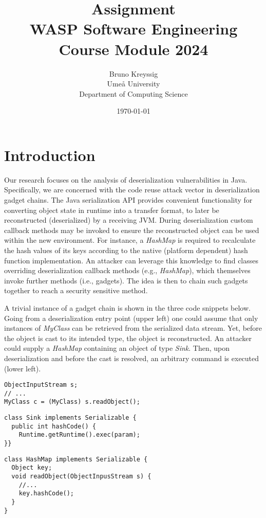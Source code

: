 \documentclass[11pt]{article}
\title{Assignment\\\Large{WASP Software Engineering Course Module 2024}}
\author{Bruno Kreyssig \\ Umeå University\\ Department of Computing Science}
\date{\today}
\begin{document}
\maketitle
\thispagestyle{fancy}
\clearpage
\tableofcontents
\thispagestyle{fancy}

\clearpage
\fancyfoot[C]{\thepage}

\section*{Introduction}

Our research focuses on the analysis of deserialization vulnerabilities in Java. Specifically, we are concerned with the code reuse attack vector in deserialization gadget chains. The Java serialization API provides convenient functionality for converting object state in runtime into a transfer format, to later be reconstructed (deserialized) by a receiving JVM. During deserialization custom callback methods may be invoked to ensure the reconstructed object can be used within the new environment. For instance, a \textit{HashMap} is required to recalculate the hash values of its keys according to the native (platform dependent) hash function implementation. An attacker can leverage this knowledge to find classes overriding deserialization callback methods (e.g., \textit{HashMap}), which themselves invoke further methods (i.e., gadgets). The idea is then to chain such gadgets together to reach a security sensitive method. 

A trivial instance of a gadget chain is shown in the three code snippets below. Going from a deserialization entry point (upper left) one could assume that only instances of \textit{MyClass} can be retrieved from the serialized data stream. Yet, before the object is cast to its intended type, the object is reconstructed. An attacker could supply a \textit{HashMap} containing an object of type \textit{Sink}. Then, upon deserialization and before the cast is resolved, an arbitrary command is executed (lower left).

\vspace{0.5cm}

\noindent\begin{minipage}{.48\textwidth}

 \begin{verbatim}
ObjectInputStream s;
// ...
MyClass c = (MyClass) s.readObject();    
\end{verbatim}
 \begin{verbatim}
class Sink implements Serializable {
  public int hashCode() {
    Runtime.getRuntime().exec(param);
}}
\end{verbatim}
\end{minipage}\hfill
\begin{minipage}{.48\textwidth}
\begin{verbatim}
class HashMap implements Serializable {
  Object key;
  void readObject(ObjectInpusStream s) {
    //...
    key.hashCode();
  }
}
\end{verbatim}
\end{minipage}
\end{document}
